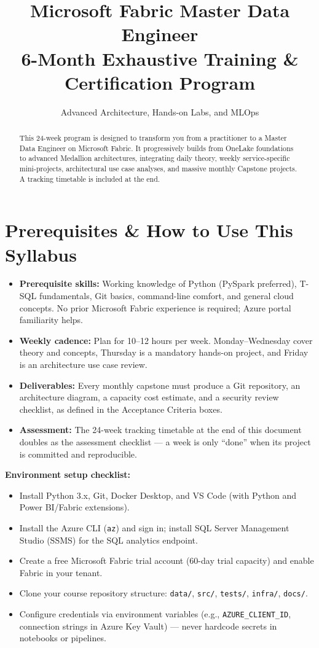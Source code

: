 \documentclass[11pt, a4paper]{article}
\title{\Huge \textbf{Microsoft Fabric Master Data Engineer}\\ \Large 6-Month Exhaustive Training \& Certification Program}
\author{Advanced Architecture, Hands-on Labs, and MLOps}
\date{}
\begin{document}
\maketitle

\begin{abstract}
\noindent This 24-week program is designed to transform you from a practitioner to a Master Data Engineer on Microsoft Fabric. It progressively builds from OneLake foundations to advanced Medallion architectures, integrating daily theory, weekly service-specific mini-projects, architectural use case analyses, and massive monthly Capstone projects. A tracking timetable is included at the end.
\end{abstract}

\tableofcontents
\newpage

\section*{Prerequisites \& How to Use This Syllabus}
\begin{itemize}[label=-]
    \item \textbf{Prerequisite skills:} Working knowledge of Python (PySpark preferred), T-SQL fundamentals, Git basics, command-line comfort, and general cloud concepts. No prior Microsoft Fabric experience is required; Azure portal familiarity helps.
    \item \textbf{Weekly cadence:} Plan for 10--12 hours per week. Monday--Wednesday cover theory and concepts, Thursday is a mandatory hands-on project, and Friday is an architecture use case review.
    \item \textbf{Deliverables:} Every monthly capstone must produce a Git repository, an architecture diagram, a capacity cost estimate, and a security review checklist, as defined in the Acceptance Criteria boxes.
    \item \textbf{Assessment:} The 24-week tracking timetable at the end of this document doubles as the assessment checklist --- a week is only ``done'' when its project is committed and reproducible.
\end{itemize}

\noindent\textbf{Environment setup checklist:}
\begin{itemize}[label=$\square$, leftmargin=8mm]
    \item Install Python 3.x, Git, Docker Desktop, and VS Code (with Python and Power BI/Fabric extensions).
    \item Install the Azure CLI (\texttt{az}) and sign in; install SQL Server Management Studio (SSMS) for the SQL analytics endpoint.
    \item Create a free Microsoft Fabric trial account (60-day trial capacity) and enable Fabric in your tenant.
    \item Clone your course repository structure: \texttt{data/}, \texttt{src/}, \texttt{tests/}, \texttt{infra/}, \texttt{docs/}.
    \item Configure credentials via environment variables (e.g., \texttt{AZURE\_CLIENT\_ID}, connection strings in Azure Key Vault) --- never hardcode secrets in notebooks or pipelines.
\end{itemize}
\end{document}
